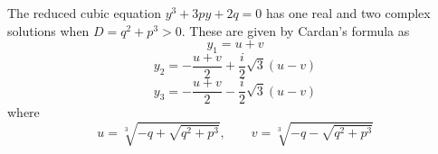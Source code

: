 \documentclass[fleqn]{article}
\begin{document}
\setlength{\mathindent}{2cm}
The reduced cubic equation $y^3 + 3py +2q = 0$ has one real and two complex
solutions when $D = q^2 + p^3 > 0$. These are given by Cardan's formula as
\begin{equation} y_1 = u + v \end{equation}
\begin{equation} y_2 = -\frac{u+v}{2} + \frac{i}{2}\sqrt{3}(u-v) \end{equation}
\begin{equation} y_3 = -\frac{u+v}{2} - \frac{i}{2}\sqrt{3}(u-v) \end{equation}
where
\[ u = \sqrt[3]{-q + \sqrt{q^2+p^3}},\qquad v = \sqrt[3]{-q - \sqrt{q^2+p^3}} \]
\end{document}
